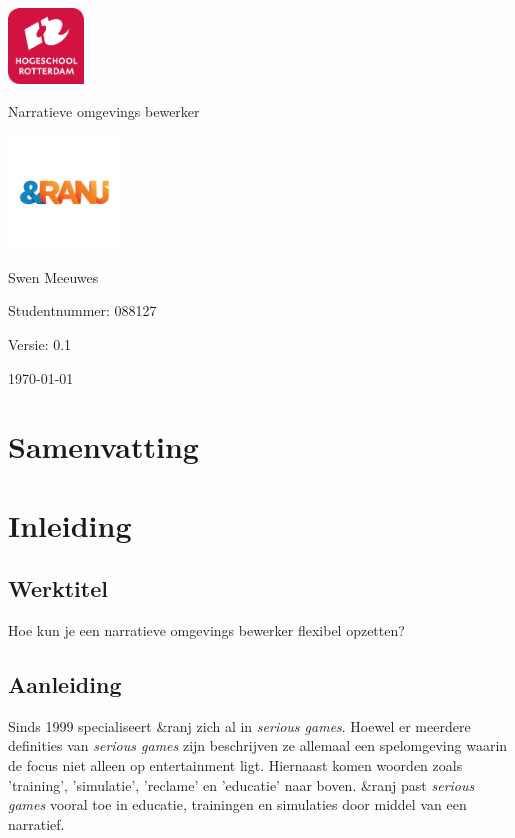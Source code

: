 \documentclass{report}
\newcommand{\versionnumber}{0.1}
\newcommand{\name}{Swen Meeuwes}
\newcommand{\studentnumber}{088127}
\newcommand{\organisation}{\&ranj }
\renewcommand{\title}{Narratieve omgevings bewerker}
\newcommand{\subtitle}{Sub title}
\begin{document}
\begin{titlepage}
        \centering
        \includegraphics[width=2cm]{Images/University}\par
        \vspace{4\baselineskip}
        {\Huge\title\par}
        \par
        \includegraphics[width=3cm]{Images/Organisation}
        \vspace{4\baselineskip}
        \par
        {\Large\name\par}
        {Studentnummer: \studentnumber\par}
        \vfill
        {\hfill Versie: \versionnumber\par}
        {\hfill \today}
\end{titlepage}

\chapter*{Samenvatting}

\newpage

\tableofcontents

\newpage

\chapter{Inleiding}
\section{Werktitel}
Hoe kun je een narratieve omgevings bewerker flexibel opzetten? %

\section{Aanleiding}
Sinds 1999 specialiseert \organisation zich al in \emph{serious games}. Hoewel er meerdere definities van \emph{serious games} zijn beschrijven ze allemaal een spelomgeving waarin de focus niet alleen op entertainment ligt\cite{Tarja2007}. Hiernaast komen woorden zoals 'training', 'simulatie', 'reclame' en 'educatie' naar boven\cite{Tarja2007}.
\organisation past \emph{serious games} vooral toe in educatie, trainingen en simulaties door middel van een narratief\cite{websiteranj}.
\end{document}
